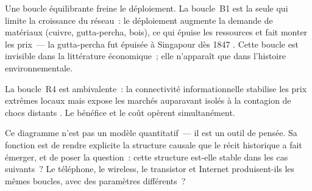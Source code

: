 Une boucle équilibrante freine le déploiement. La boucle~B1 est la seule qui limite la croissance du réseau~: le déploiement augmente la demande de matériaux (cuivre, gutta-percha, bois), ce qui épuise les ressources et fait monter les prix~--- la gutta-percha fut épuisée à Singapour dès 1847 \parencite{tully_victorian_2009}. Cette boucle est invisible dans la littérature économique~; elle n'apparaît que dans l'histoire environnementale.

La boucle~R4 est ambivalente~: la connectivité informationnelle stabilise les prix extrêmes locaux mais expose les marchés auparavant isolés à la contagion de chocs distants \parencite{gao_communication_2021}. Le bénéfice et le coût opèrent simultanément.

Ce diagramme n'est pas un modèle quantitatif~--- il est un outil de pensée. Sa fonction est de rendre explicite la structure causale que le récit historique a fait émerger, et de poser la question~: cette structure est-elle stable dans les cas suivants~? Le téléphone, le wireless, le transistor et Internet produisent-ils les mêmes boucles, avec des paramètres différents~?
